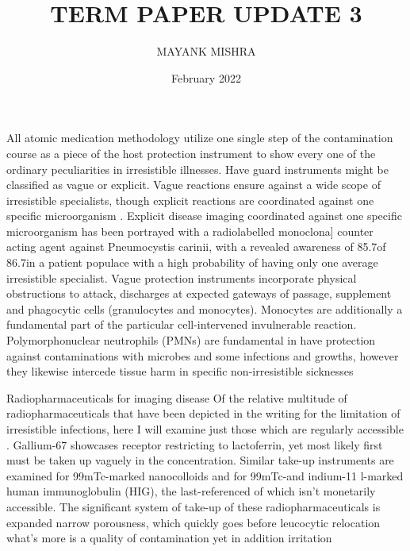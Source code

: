 \documentclass{article}
\title{TERM PAPER UPDATE 3}
\author{MAYANK MISHRA }
\date{February 2022}
\begin{document}
\maketitle

\section{}
All atomic medication methodology utilize one single step of the contamination
course as a piece of the host protection instrument to show every one of the
ordinary peculiarities in irresistible illnesses. Have guard instruments might
be classified as vague or explicit. Vague reactions ensure against a wide scope
of irresistible specialists, though explicit reactions are coordinated against one
specific microorganism . Explicit disease imaging coordinated against one specific
microorganism has been portrayed with a radiolabelled monoclona] counter
acting agent against Pneumocystis carinii, with a revealed awareness of 85.7of
86.7in a patient populace with a high probability of having only one average
irresistible specialist. Vague protection instruments incorporate physical obstructions
to attack, discharges at expected gateways of passage, supplement
and phagocytic cells (granulocytes and monocytes). Monocytes are additionally
a fundamental part of the particular cell-intervened invulnerable reaction. Polymorphonuclear
neutrophils (PMNs) are fundamental in have protection against
contaminations with microbes and some infections and growths, however they
likewise intercede tissue harm in specific non-irresistible sicknesses

Radiopharmaceuticals for imaging disease
Of the relative multitude of radiopharmaceuticals that have been depicted
in the writing for the limitation of irresistible infections,
here I will examine just those which are regularly
accessible . Gallium-67 showcases receptor restricting
to lactoferrin, yet most likely first must be taken up
vaguely in the concentration. Similar take-up instruments
are examined for 99mTc-marked nanocolloids and
for 99mTc-and indium-11 l-marked human immunoglobulin
(HIG), the last-referenced of which isn't monetarily
accessible. The significant system of take-up of
these radiopharmaceuticals is expanded narrow porousness,
which quickly goes before leucocytic relocation
what's more is a quality of contamination yet in addition irritation
\end{document}
